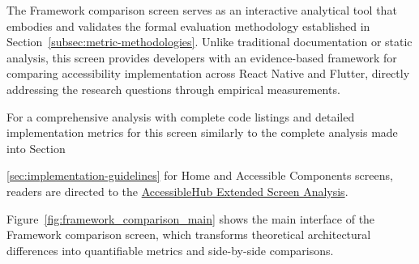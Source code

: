 The Framework comparison screen serves as an interactive analytical tool that embodies and validates the formal evaluation methodology established in Section~\ref{subsec:metric-methodologies}. Unlike traditional documentation or static analysis, this screen provides developers with an evidence-based framework for comparing accessibility implementation across React Native and Flutter, directly addressing the research questions through empirical measurements.

For a comprehensive analysis with complete code listings and detailed implementation metrics for this screen similarly to the complete analysis made into Section~{\ref{sec:implementation-guidelines} for Home and Accessible Components screens, readers are directed to the \href{https://github.com/gabrielrovesti/AccessibleHub/blob/main/Technical\%20Thesis\%20Appendix/AccessibleHub\%20-\%20Extended\%20screen\%20analysis.pdf}{AccessibleHub Extended Screen Analysis}.

Figure~\ref{fig:framework_comparison_main} shows the main interface of the Framework comparison screen, which transforms theoretical architectural differences into quantifiable metrics and side-by-side comparisons.

}
